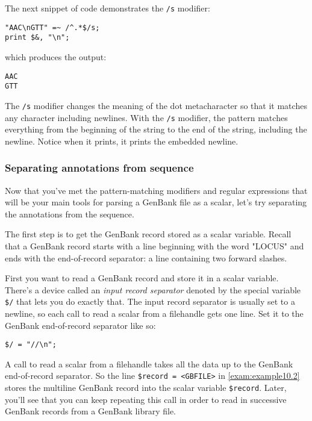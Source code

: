 The next snippet of code demonstrates the \verb|/s| modifier: 

\begin{lstlisting}
"AAC\nGTT" =~ /^.*$/s;
print $&, "\n";
\end{lstlisting}

which produces the output:

\begin{lstlisting}
AAC
GTT
\end{lstlisting}

The \verb|/s| modifier changes the meaning of the dot metacharacter so that it matches any character including newlines. With the \verb|/s| modifier, the pattern matches everything from the beginning of the string to the end of the string, including the newline. Notice when it prints, it prints the embedded newline. 

\subsubsection{Separating annotations from sequence}
Now that you've met the pattern-matching modifiers and regular expressions that will be your main tools for parsing a GenBank file as a scalar, let's try separating the annotations from the sequence.

The first step is to get the GenBank record stored as a scalar variable. Recall that a GenBank record starts with a line beginning with the word "LOCUS" and ends with the end-of-record separator: a line containing two forward slashes.

First you want to read a GenBank record and store it in a scalar variable. There's a device called an \textit{input record separator} denoted by the special variable \verb|$/| that lets you do exactly that. The input record separator is usually set to a newline, so each call to read a scalar from a filehandle gets one line. Set it to the GenBank end-of-record separator like so: 

\begin{lstlisting}
$/ = "//\n";
\end{lstlisting}

A call to read a scalar from a filehandle takes all the data up to the GenBank end-of-record separator. So the line \verb|$record = <GBFILE>| in \autoref{exam:example10.2} stores the multiline GenBank record into the scalar variable \verb|$record|. Later, you'll see that you can keep repeating this call in order to read in successive GenBank records from a GenBank library file.

